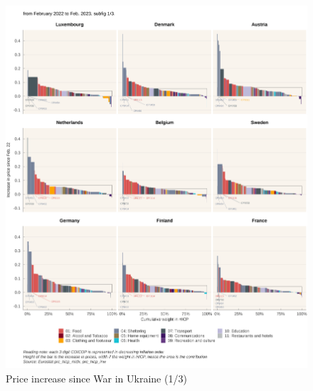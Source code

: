 \documentclass[
  9pt,
  a4paper,
  numbers=noendperiod,
  DIV=12]{scrartcl}
\begin{document}
\begin{figure}[htb]

\caption{\label{fig-priceinc1}Price increase since War in Ukraine (1/3)}

{\centering \includegraphics[width=1\textwidth,height=\textheight]{SIWU_brief_files/figure-pdf/fig-priceinc1-1.png}

}

\end{figure}
\end{document}
